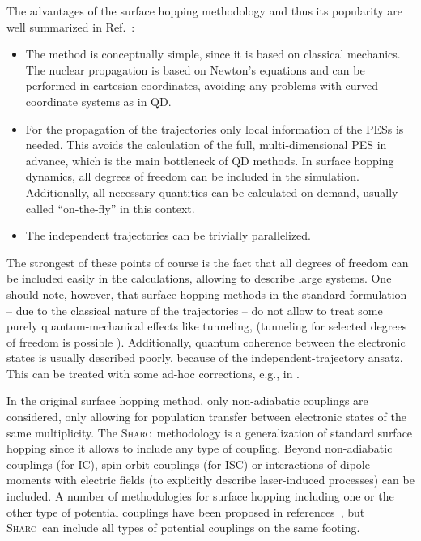 \documentclass[a4paper,11pt,DIV=15,openany,twoside=false]{scrbook}
\newcommand{\sharc}{\textsc{Sharc}}
\begin{document}
The advantages of the surface hopping methodology and thus its popularity are well summarized in Ref.~\cite{Barbatti2011WCMS}:
\begin{itemize}
  \item The method is conceptually simple, since it is based on classical mechanics. The nuclear propagation is based on Newton's equations and can be performed in cartesian coordinates, avoiding any problems with curved coordinate systems as in QD.
  \item For the propagation of the trajectories only local information of the PESs is needed. This avoids the calculation of the full, multi-dimensional PES in advance, which is the main bottleneck of QD methods. In surface hopping dynamics, all degrees of freedom can be included in the simulation. Additionally, all necessary quantities can be calculated on-demand, usually called ``on-the-fly'' in this context.
  \item The independent trajectories can be trivially parallelized.
\end{itemize}
The strongest of these points of course is the fact that all degrees of freedom can be included easily in the calculations, allowing to describe large systems.
One should note, however, that surface hopping methods in the standard formulation~\cite{Tully1971JCP, Tully1990JCP} -- due to  the classical nature of the trajectories -- do not allow to treat some purely quantum-mechanical effects like tunneling, (tunneling for selected degrees of freedom is possible \cite{Hammes-Schiffer1994JCP}). Additionally, quantum coherence between the electronic states is usually described poorly, because of the independent-trajectory ansatz. This can be treated with some ad-hoc corrections, e.g., in \cite{Granucci2007JCP}.

In the original surface hopping method, only non-adiabatic couplings are considered, only allowing for population transfer between electronic states of the same multiplicity. 
The \sharc\ methodology is a generalization of standard surface hopping since it allows to include any type of coupling. Beyond non-adiabatic couplings (for IC), spin-orbit couplings (for ISC) or interactions of dipole moments with electric fields (to explicitly describe laser-induced processes) can be included.
A number of methodologies for surface hopping including one or the other type of potential couplings have been proposed in references~\cite{Thachuk1996JCP,Maiti2004JPCA,Jones2008JPCA,Mitric2009PRA,Granucci2012JCP,Curchod2013C,Cui2014JCP}, but \sharc\ can include all types of potential couplings on the same footing. 
\end{document}
